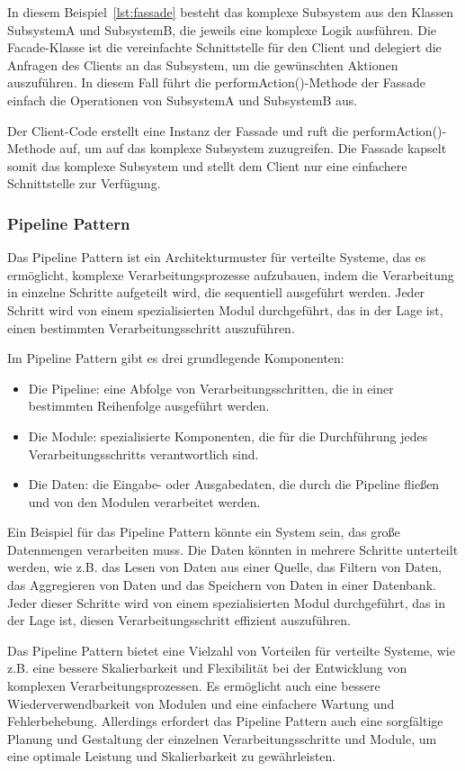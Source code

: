 In diesem Beispiel~\ref{lst:fassade} besteht das komplexe Subsystem aus den Klassen SubsystemA und SubsystemB, die jeweils eine komplexe Logik ausführen. Die Facade-Klasse ist die vereinfachte Schnittstelle für den Client und delegiert die Anfragen des Clients an das Subsystem, um die gewünschten Aktionen auszuführen. In diesem Fall führt die performAction()-Methode der Fassade einfach die Operationen von SubsystemA und SubsystemB aus.

Der Client-Code erstellt eine Instanz der Fassade und ruft die performAction()-Methode auf, um auf das komplexe Subsystem zuzugreifen. Die Fassade kapselt somit das komplexe Subsystem und stellt dem Client nur eine einfachere Schnittstelle zur Verfügung.




\subsubsection{Pipeline Pattern}
Das Pipeline Pattern ist ein Architekturmuster für verteilte Systeme, das es ermöglicht, komplexe Verarbeitungsprozesse aufzubauen, indem die Verarbeitung in einzelne Schritte aufgeteilt wird, die sequentiell ausgeführt werden. Jeder Schritt wird von einem spezialisierten Modul durchgeführt, das in der Lage ist, einen bestimmten Verarbeitungsschritt auszuführen.

Im Pipeline Pattern gibt es drei grundlegende Komponenten:
\begin{itemize} 
\item Die Pipeline: eine Abfolge von Verarbeitungsschritten, die in einer bestimmten Reihenfolge ausgeführt werden.
\item Die Module: spezialisierte Komponenten, die für die Durchführung jedes Verarbeitungsschritts verantwortlich sind.
\item Die Daten: die Eingabe- oder Ausgabedaten, die durch die Pipeline fließen und von den Modulen verarbeitet werden.
\end{itemize} 
Ein Beispiel für das Pipeline Pattern könnte ein System sein, das große Datenmengen verarbeiten muss. Die Daten könnten in mehrere Schritte unterteilt werden, wie z.B. das Lesen von Daten aus einer Quelle, das Filtern von Daten, das Aggregieren von Daten und das Speichern von Daten in einer Datenbank. Jeder dieser Schritte wird von einem spezialisierten Modul durchgeführt, das in der Lage ist, diesen Verarbeitungsschritt effizient auszuführen.

Das Pipeline Pattern bietet eine Vielzahl von Vorteilen für verteilte Systeme, wie z.B. eine bessere Skalierbarkeit und Flexibilität bei der Entwicklung von komplexen Verarbeitungsprozessen. Es ermöglicht auch eine bessere Wiederverwendbarkeit von Modulen und eine einfachere Wartung und Fehlerbehebung. Allerdings erfordert das Pipeline Pattern auch eine sorgfältige Planung und Gestaltung der einzelnen Verarbeitungsschritte und Module, um eine optimale Leistung und Skalierbarkeit zu gewährleisten.

